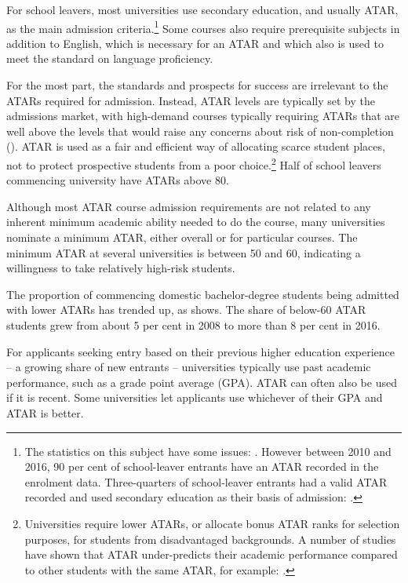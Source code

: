 For school leavers, most universities use secondary education, and usually ATAR, as the main admission criteria.\footnote{The statistics on this subject have some issues: \textcite{Cherastidtham2018}. 
However between 2010 and 2016, 90 per cent of school-leaver entrants have an ATAR recorded in the enrolment data. Three-quarters of school-leaver entrants had a valid ATAR recorded and used secondary education as their basis of admission: \textcite{DepartmentofEducationandTraininga}.} Some courses also require prerequisite subjects in addition to English, which is necessary for an ATAR and which also is used to meet the standard on language proficiency.

For the most part, the standards and prospects for success are irrelevant to the ATARs required for admission. Instead, ATAR levels are typically set by the admissions market, with high-demand courses typically requiring ATARs that are well above the levels that would raise any concerns about risk of non-completion (). ATAR is used as a fair and efficient way of allocating scarce student places, not to protect prospective students from a poor choice.\footnote{Universities require lower ATARs, or allocate bonus ATAR ranks for selection purposes, for students from disadvantaged backgrounds. A number of studies have shown that ATAR under-predicts their academic performance compared to other students with the same ATAR, for example: \textcites[][]{Li2014}[][]{Messinis2015a}.} Half of school leavers commencing university have ATARs above 80.

Although most ATAR course admission requirements are not related to any inherent minimum academic ability needed to do the course, many universities nominate a minimum ATAR, either overall or for particular courses. The minimum ATAR at several universities is between 50 and 60, indicating a willingness to take relatively high-risk students.

The proportion of commencing domestic bachelor-degree students being admitted with lower ATARs has trended up, as  shows. The share of below-60 ATAR students grew from about 5 per cent in 2008 to more than 8 per cent in 2016.

For applicants seeking entry based on their previous higher education experience -- a growing share of new entrants -- universities typically use past academic performance, such as a grade point average (GPA). ATAR can often also be used if it is recent. Some universities let applicants use whichever of their GPA and ATAR is better.

